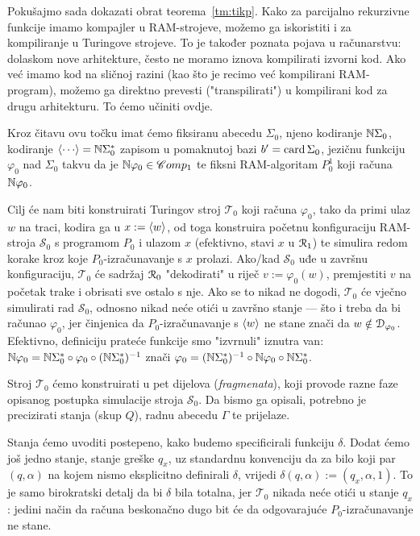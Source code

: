 Pokušajmo sada dokazati obrat teorema~\ref{tm:tikp}. Kako za parcijalno rekurzivne funkcije imamo kompajler u RAM-strojeve, možemo ga iskoristiti i za kompiliranje u Turingove strojeve. To je također poznata pojava u računarstvu: dolaskom nove arhitekture, često ne moramo iznova kompilirati izvorni kod. Ako već imamo kod na sličnoj razini (kao što je recimo već kompilirani RAM-program), možemo ga direktno prevesti ("transpilirati") u kompilirani kod za drugu arhitekturu. To ćemo učiniti ovdje.

Kroz čitavu ovu točku imat ćemo fiksiranu abecedu $\Sigma_0$, njeno kodiranje ${\mathbb N}\Sigma_0$, kodiranje $\kr{\cdots}=\N\Sigma_0^*$ zapisom u pomaknutoj bazi $b'=\operatorname{card}\Sigma_0$, jezičnu funkciju $\varphi_0$ nad $\Sigma_0$ takvu da je ${\mathbb N}\varphi_0\in\mathscr Comp_1$ te fiksni RAM-algoritam $P_0^1$ koji računa ${\mathbb N}\varphi_0$. 

Cilj će nam biti konstruirati Turingov stroj $\mathcal T_0$ koji računa $\varphi_0$, tako da primi ulaz $w$ na traci, kodira ga u $x:=\langle w\rangle$, od toga konstruira početnu konfiguraciju RAM-stroja $\mathcal S_0$ s programom $P_0$ i ulazom $x$ (efektivno, stavi $x$ u $\mathcal R_{1}$) te simulira redom korake kroz koje $P_0$-izračunavanje s $x$ prolazi. Ako\slash kad $\mathcal S_0$ uđe u završnu konfiguraciju, $\mathcal T_0$ će sadržaj $\mathcal R_{0}$ "dekodirati" u riječ $v:=\varphi_0(w)$, premjestiti $v$ na početak trake i obrisati sve ostalo s nje. Ako se to nikad ne dogodi, $\mathcal T_0$ će vječno simulirati rad $\mathcal S_0$, odnosno nikad neće otići u završno stanje --- što i treba da bi računao $\varphi_0$, jer činjenica da $P_0$-izračunavanje s $\langle w\rangle$ ne stane znači da $w\notin\mathcal D_{\varphi_0}$. Efektivno, definiciju prateće funkcije smo "izvrnuli" iznutra van: ${\mathbb N}\varphi_0={\mathbb N}\Sigma_0^*\circ\varphi_0\circ({\mathbb N}\Sigma_0^*)^{-1}$ znači $\varphi_0=({\mathbb N}\Sigma_0^*)^{-1}\circ{\mathbb N}\varphi_0\circ{\mathbb N}\Sigma_0^*$.

Stroj $\mathcal T_0$ ćemo konstruirati u pet dijelova (\emph{fragmenata}), koji provode razne faze opisanog postupka simulacije stroja $\mathcal S_0$. Da bismo ga opisali, potrebno je precizirati stanja (skup $Q$), radnu abecedu $\Gamma$ te prijelaze.

Stanja ćemo uvoditi postepeno, kako budemo specificirali funkciju $\delta$. Dodat ćemo još jedno stanje, stanje greške $q_x$, uz standardnu konvenciju da za bilo koji par $(q,\alpha)$ na kojem nismo eksplicitno definirali $\delta$, vrijedi $\delta(q,\alpha):=(q_x,\alpha,1)$. To je samo birokratski detalj da bi $\delta$ bila totalna, jer $\mathcal T_0$ nikada neće otići u stanje $q_x$: jedini način da računa beskonačno dugo bit će da odgovarajuće $P_0$-izračunavanje ne stane.

